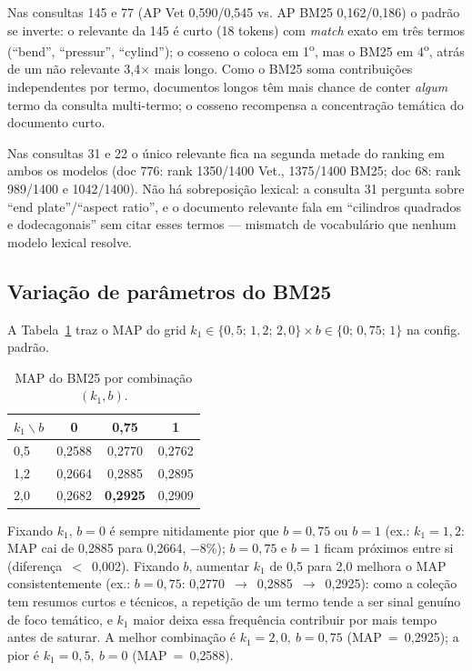 \documentclass[runningheads]{llncs}
\begin{document}
Nas consultas 145 e 77 (AP Vet 0{,}590/0{,}545 vs. AP BM25 0{,}162/0{,}186) o padrão se inverte: o relevante da 145 é curto (18 tokens) com \emph{match} exato em três termos (``bend'', ``pressur'', ``cylind''); o cosseno o coloca em 1\textsuperscript{o}, mas o BM25 em 4\textsuperscript{o}, atrás de um não relevante 3,4$\times$ mais longo. Como o BM25 soma contribuições independentes por termo, documentos longos têm mais chance de conter \emph{algum} termo da consulta multi-termo; o cosseno recompensa a concentração temática do documento curto.

Nas consultas 31 e 22 o único relevante fica na segunda metade do ranking em ambos os modelos (doc 776: rank 1350/1400 Vet., 1375/1400 BM25; doc 68: rank 989/1400 e 1042/1400). Não há sobreposição lexical: a consulta 31 pergunta sobre ``end plate''/``aspect ratio'', e o documento relevante fala em ``cilindros quadrados e dodecagonais'' sem citar esses termos --- mismatch de vocabulário que nenhum modelo lexical resolve.

\vspace{-1.0em}
\subsection{Variação de parâmetros do BM25}

A Tabela~\ref{tab:grid} traz o MAP do grid $k_1 \in \{0{,}5;\,1{,}2;\,2{,}0\} \times b \in \{0;\,0{,}75;\,1\}$ na config. padrão.

\begin{table}[t]
\centering
\caption{MAP do BM25 por combinação $(k_1, b)$.}
\label{tab:grid}
\small
\begin{tabular}{lccc}
\toprule
$k_1 \backslash b$ & 0 & 0{,}75 & 1 \\
\midrule
0{,}5 & 0{,}2588 & 0{,}2770 & 0{,}2762 \\
1{,}2 & 0{,}2664 & 0{,}2885 & 0{,}2895 \\
2{,}0 & 0{,}2682 & \textbf{0{,}2925} & 0{,}2909 \\
\bottomrule
\end{tabular}
\end{table}

Fixando $k_1$, $b=0$ é sempre nitidamente pior que $b=0{,}75$ ou $b=1$ (ex.: $k_1=1{,}2$: MAP cai de 0{,}2885 para 0{,}2664, $-$8\%); $b=0{,}75$ e $b=1$ ficam próximos entre si (diferença~$<$~0{,}002). Fixando $b$, aumentar $k_1$ de 0{,}5 para 2{,}0 melhora o MAP consistentemente (ex.: $b=0{,}75$: 0{,}2770~$\to$~0{,}2885~$\to$~0{,}2925): como a coleção tem resumos curtos e técnicos, a repetição de um termo tende a ser sinal genuíno de foco temático, e $k_1$ maior deixa essa frequência contribuir por mais tempo antes de saturar. A melhor combinação é $k_1=2{,}0,\ b=0{,}75$ (MAP~=~0{,}2925); a pior é $k_1=0{,}5,\ b=0$ (MAP~=~0{,}2588).
\end{document}
